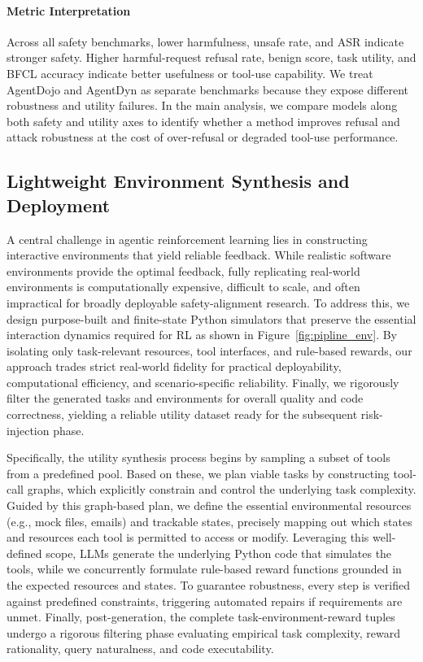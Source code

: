 \documentclass{llmxive}
\begin{document}
\paragraph{Metric Interpretation}
Across all safety benchmarks, lower harmfulness, unsafe rate, and ASR indicate stronger safety. Higher harmful-request refusal rate, benign score, task utility, and BFCL accuracy indicate better usefulness or tool-use capability. We treat AgentDojo and AgentDyn as separate benchmarks because they expose different robustness and utility failures. In the main analysis, we compare models along both safety and utility axes to identify whether a method improves refusal and attack robustness at the cost of over-refusal or degraded tool-use performance.

\subsection{Lightweight Environment Synthesis and Deployment}
\label{app:env}
A central challenge in agentic reinforcement learning lies in constructing interactive environments that yield reliable feedback. While realistic software environments provide the optimal feedback, fully replicating real-world environments is computationally expensive, difficult to scale, and often impractical for broadly deployable safety-alignment research. To address this, we design purpose-built and finite-state Python simulators that preserve the essential interaction dynamics required for RL as shown in Figure~\ref{fig:pipline_env}. By isolating only task-relevant resources, tool interfaces, and rule-based rewards, our approach trades strict real-world fidelity for practical deployability, computational efficiency, and scenario-specific reliability. Finally, we rigorously filter the generated tasks and environments for overall quality and code correctness, yielding a reliable utility dataset ready for the subsequent risk-injection phase.

Specifically, the utility synthesis process begins by sampling a subset of tools from a predefined pool. Based on these, we plan viable tasks by constructing tool-call graphs, which explicitly constrain and control the underlying task complexity. Guided by this graph-based plan, we define the essential environmental resources (e.g., mock files, emails) and trackable states, precisely mapping out which states and resources each tool is permitted to access or modify. Leveraging this well-defined scope, LLMs generate the underlying Python code that simulates the tools, while we concurrently formulate rule-based reward functions grounded in the expected resources and states. To guarantee robustness, every step is verified against predefined constraints, triggering automated repairs if requirements are unmet. Finally, post-generation, the complete task-environment-reward tuples undergo a rigorous filtering phase evaluating empirical task complexity, reward rationality, query naturalness, and code executability.
\end{document}
